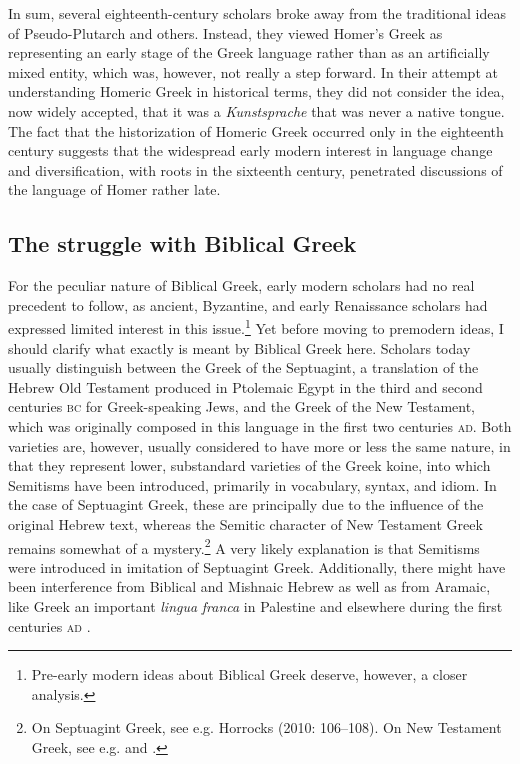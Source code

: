 In sum, several eighteenth-century scholars broke away from the traditional ideas of Pseudo-Plutarch and others. Instead, they viewed Homer’s Greek as representing an early stage of the Greek language rather than as an artificially mixed entity, which was, however, not really a step forward. In their attempt at understanding Homeric Greek in historical terms, they did not consider the idea, now widely accepted, that it was a \textit{Kunstsprache} that was never a native tongue. The fact that the historization of Homeric Greek occurred only in the eighteenth century suggests that the widespread early modern interest in language change and diversification, with roots in the sixteenth century, penetrated discussions of the language of Homer rather late.

\subsection{The struggle with Biblical Greek}
\hypertarget{Toc19704830}{}
For the peculiar nature of Biblical Greek, early modern scholars had no real precedent to follow, as ancient, Byzantine, and early Renaissance scholars had expressed limited interest in this issue.\footnote{Pre-early modern ideas about Biblical Greek deserve, however, a closer analysis.} Yet before moving to premodern ideas, I should clarify what exactly is meant by Biblical Greek here. Scholars today usually distinguish between the Greek of the Septuagint, a translation of the Hebrew Old Testament produced in Ptolemaic Egypt in the third and second centuries \textsc{bc} for Greek-speaking Jews, and the Greek of the New Testament, which was originally composed in this language in the first two centuries \textsc{ad}. Both varieties are, however, usually considered to have more or less the same nature, in that they represent lower, substandard varieties of the Greek koine, into which Semitisms have been introduced, primarily in vocabulary, syntax, and idiom. In the case of Septuagint Greek, these are principally due to the influence of the original Hebrew text, whereas the Semitic character of New Testament Greek remains somewhat of a mystery.\footnote{On Septuagint Greek, see e.g. Horrocks (2010: 106–108). On New Testament Greek, see e.g. \citet{Janse2007} and \citet{PorterPitts2013}.} A very likely explanation is that Semitisms were introduced in imitation of Septuagint Greek. Additionally, there might have been interference from Biblical and Mishnaic Hebrew as well as from Aramaic, like Greek an important \textit{lingua} \textit{franca} in Palestine and elsewhere during the first centuries \textsc{ad} \citep{Janse2007}.


